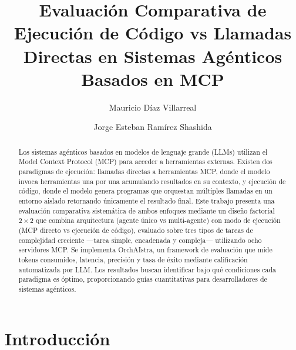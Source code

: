 \documentclass[runningheads]{llncs}
\begin{document}
%
\title{Evaluaci\'on Comparativa de Ejecuci\'on de C\'odigo vs Llamadas Directas en Sistemas Ag\'enticos Basados en MCP}
%
%
\author{Mauricio D\'iaz Villarreal \and
Jorge Esteban Ram\'irez Shashida}
%
%
%
\maketitle
%
\begin{abstract}
Los sistemas ag\'enticos basados en modelos de lenguaje grande (LLMs) utilizan
el Model Context Protocol (MCP) para acceder a herramientas externas. Existen
dos paradigmas de ejecuci\'on: llamadas directas a herramientas MCP, donde el
modelo invoca herramientas una por una acumulando resultados en su contexto, y
ejecuci\'on de c\'odigo, donde el modelo genera programas que orquestan m\'ultiples
llamadas en un entorno aislado retornando \'unicamente el resultado final.
Este trabajo presenta una evaluaci\'on comparativa sistem\'atica de ambos enfoques
mediante un dise\~no factorial $2 \times 2$ que combina arquitectura (agente
\'unico vs multi-agente) con modo de ejecuci\'on (MCP directo vs ejecuci\'on de
c\'odigo), evaluado sobre tres tipos de tareas de complejidad creciente ---tarea
simple, encadenada y compleja--- utilizando ocho servidores MCP. Se implementa
OrchAIstra, un framework de evaluaci\'on que mide tokens consumidos, latencia,
precisi\'on y tasa de \'exito mediante calificaci\'on automatizada por LLM.
Los resultados buscan identificar bajo qu\'e condiciones cada paradigma es
\'optimo, proporcionando gu\'ias cuantitativas para desarrolladores de sistemas
ag\'enticos.

\end{abstract}
%
\section{Introducci\'on}
\label{sec:intro}
\end{document}
